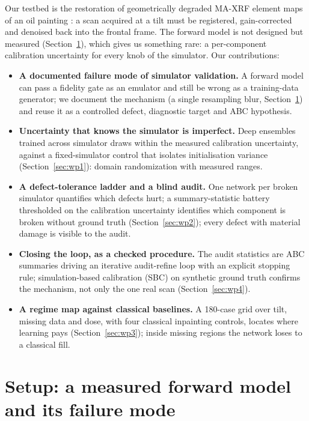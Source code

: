 \documentclass{article}
\begin{document}
Our testbed is the restoration of geometrically degraded MA-XRF element maps of an oil painting \citep{alfeld2013}: a scan acquired at a tilt must be registered, gain-corrected and denoised back into the frontal frame. The forward model is not designed but measured (Section~\ref{sec:setup}), which gives us something rare: a per-component calibration uncertainty for every knob of the simulator. Our contributions:

\begin{itemize}
  \item \textbf{A documented failure mode of simulator validation.} A forward model can pass a fidelity gate as an emulator and still be wrong as a training-data generator; we document the mechanism (a single resampling blur, Section~\ref{sec:setup}) and reuse it as a controlled defect, diagnostic target and ABC hypothesis.
  \item \textbf{Uncertainty that knows the simulator is imperfect.} Deep ensembles \citep{lakshminarayanan2017} trained across simulator draws within the measured calibration uncertainty, against a fixed-simulator control that isolates initialisation variance (Section~\ref{sec:wp1}): domain randomization \citep{tobin2017} with measured ranges.
  \item \textbf{A defect-tolerance ladder and a blind audit.} One network per broken simulator quantifies which defects hurt; a summary-statistic battery thresholded on the calibration uncertainty identifies which component is broken without ground truth (Section~\ref{sec:wp2}); every defect with material damage is visible to the audit.
  \item \textbf{Closing the loop, as a checked procedure.} The audit statistics are ABC summaries \citep{beaumont2002,cranmer2020} driving an iterative audit-refine loop with an explicit stopping rule; simulation-based calibration (SBC) \citep{talts2018} on synthetic ground truth confirms the mechanism, not only the one real scan (Section~\ref{sec:wp4}).
  \item \textbf{A regime map against classical baselines.} A 180-case grid over tilt, missing data and dose, with four classical inpainting controls, locates where learning pays (Section~\ref{sec:wp3}); inside missing regions the network loses to a classical fill.
\end{itemize}

\section{Setup: a measured forward model and its failure mode}
\label{sec:setup}
\end{document}

